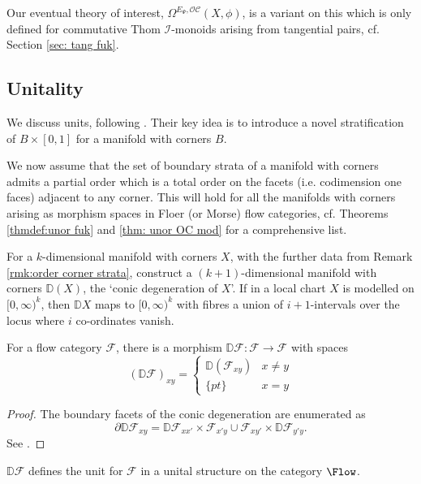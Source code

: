 \documentclass{TPmod}
\def\bD{\mathbb{D}}
\newcommand{\cC}{\mathcal{C}}
\newcommand{\cF}{\mathcal{F}}
\newcommand{\cI}{\mathcal{I}}
\newcommand{\cO}{\mathcal{O}}
\numberwithin{equation}{section}
\begin{document}
Our eventual theory of interest, $\Omega^{E_\Psi, \cO\cC}(X, \phi)$, is a variant on this which is only defined for commutative Thom $\cI$-monoids arising from tangential pairs, cf. Section \ref{sec: tang fuk}.

\subsection{Unitality\label{Sec:unitality}}

We discuss units, following \cite[Section 6]{AB2}. Their key idea is to introduce a novel stratification of $B\times [0,1]$ for a manifold with corners $B$.  


\begin{rmk} \label{rmk:order corner strata}
   We now assume that the set of boundary strata of a manifold with corners admits a partial order which is a total order on the facets (i.e. codimension one faces)  adjacent to any corner. This will hold for all the manifolds with corners arising as morphism spaces in Floer (or Morse) flow categories, cf. Theorems \ref{thmdef:unor fuk} and \ref{thm: unor OC mod} for a comprehensive list. 
\end{rmk}

    For a $k$-dimensional manifold with corners $X$, with the further data from Remark \ref{rmk:order corner strata}, \cite[Lemma 6.3 \& Definition 6.4]{AB2} construct a $(k+1)$-dimensional manifold with corners $\bD(X)$, the `conic degeneration of $X$'. If in a local chart $X$ is modelled on $[0,\infty)^k$, then $\bD X$ maps to $[0,\infty)^k$ with fibres a union of $i+1$-intervals over the locus where $i$ co-ordinates vanish. 
    
    \begin{lem}
        For a flow category $\cF$, there is a morphism $\bD\cF: \cF \to \cF$ with spaces
    \[
    (\bD\cF)_{xy} = \begin{cases} \bD(\cF_{xy}) & x\neq y \\ \{pt\} &  x=y\end{cases}
    \]
    \end{lem}

    \begin{proof}
        The boundary facets of the conic degeneration are enumerated as
    \[
    \partial \bD\cF_{xy} = \bD\cF_{xx'} \times \cF_{x'y} \cup \cF_{xy'} \times \bD\cF_{y'y}.
    \]
    See \cite[Lemma 6.7]{AB2}.
    \end{proof}

    \begin{lem}\label{lem: flow unit unor}
        $\bD\cF$ defines the unit for $\cF$ in a unital structure on the category $\Flow$. 
    \end{lem}
\end{document}
